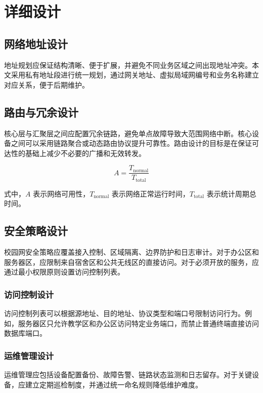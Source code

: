 \chapter{详细设计}

\section{网络地址设计}

地址规划应保证结构清晰、便于扩展，并避免不同业务区域之间出现地址冲突。本文采用私有地址段进行统一规划，通过网关地址、虚拟局域网编号和业务名称建立对应关系，便于后期维护。

\section{路由与冗余设计}

核心层与汇聚层之间应配置冗余链路，避免单点故障导致大范围网络中断。核心设备之间可以采用链路聚合或动态路由协议提升可靠性。路由设计的目标是在保证可达性的基础上减少不必要的广播和无效转发。

\begin{equation}
  A = \frac{T_{\mathrm{normal}}}{T_{\mathrm{total}}}
\end{equation}

式中，$A$ 表示网络可用性，$T_{\mathrm{normal}}$ 表示网络正常运行时间，$T_{\mathrm{total}}$ 表示统计周期总时间。

\section{安全策略设计}

校园网安全策略应覆盖接入控制、区域隔离、边界防护和日志审计。对于办公区和服务器区，应限制来自宿舍区和公共无线区的直接访问。对于必须开放的服务，应通过最小权限原则设置访问控制列表。

\subsection{访问控制设计}

访问控制列表可以根据源地址、目的地址、协议类型和端口号限制访问行为。例如，服务器区只允许教学区和办公区访问特定业务端口，而禁止普通终端直接访问数据库端口。

\subsection{运维管理设计}

运维管理应包括设备配置备份、故障告警、链路状态监测和日志留存。对于关键设备，应建立定期巡检制度，并通过统一命名规则降低维护难度。

